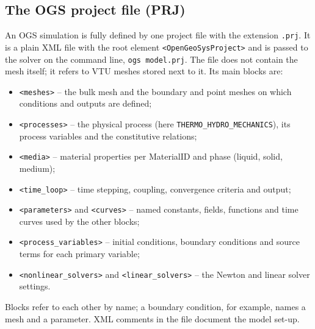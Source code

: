 \documentclass[11pt,a4paper]{article}
\begin{document}
\subsection{The OGS project file (PRJ)}
An OGS simulation is fully defined by one project file with the extension
\texttt{.prj}. It is a plain XML file with the root element
\texttt{<OpenGeoSysProject>} and is passed to the solver on the command line,
\texttt{ogs model.prj}. The file does not contain the mesh itself; it refers to
VTU meshes stored next to it. Its main blocks are:
\begin{itemize}[itemsep=0pt]
  \item \texttt{<meshes>} -- the bulk mesh and the boundary and point meshes on
        which conditions and outputs are defined;
  \item \texttt{<processes>} -- the physical process (here
        \texttt{THERMO\_HYDRO\_MECHANICS}), its process variables and the
        constitutive relations;
  \item \texttt{<media>} -- material properties per MaterialID and phase
        (liquid, solid, medium);
  \item \texttt{<time\_loop>} -- time stepping, coupling, convergence criteria and
        output;
  \item \texttt{<parameters>} and \texttt{<curves>} -- named constants, fields,
        functions and time curves used by the other blocks;
  \item \texttt{<process\_variables>} -- initial conditions, boundary conditions
        and source terms for each primary variable;
  \item \texttt{<nonlinear\_solvers>} and \texttt{<linear\_solvers>} -- the
        Newton and linear solver settings.
\end{itemize}
Blocks refer to each other by name; a boundary condition, for example, names a
mesh and a parameter. XML comments in the file document the model set-up.
\end{document}

